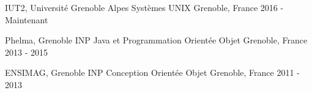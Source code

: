 

\begin{cventries}

  \cventrynodescr
    {IUT2, Université Grenoble Alpes} %
    {Systèmes UNIX} %
    {Grenoble, France} %
    {2016 - Maintenant} %

  \cventrynodescr
    {Phelma, Grenoble INP} %
    {Java et Programmation Orientée Objet} %
    {Grenoble, France} %
    {2013 - 2015} %

  \cventrynodescr
    {ENSIMAG, Grenoble INP} %
    {Conception Orientée Objet} %
    {Grenoble, France} %
    {2011 - 2013} %
    
\end{cventries}
